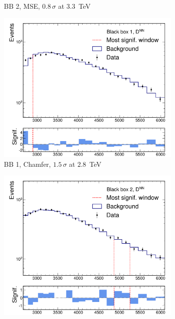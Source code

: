 \documentclass[letterpaper,11pt]{article}
\begin{document}
\begin{figure}[htpb]
\begin{subfigure}[b]{0.45\textwidth}
        \caption*{BB 2, MSE, $0.8\,\sigma$ at $3.3$~TeV}
    \end{subfigure}
    \begin{subfigure}[b]{0.45\textwidth}
        \includegraphics[width=\textwidth]{figures/gae_sparseloss/bb1_EdgeNetSparseLoss_bumphunter.pdf}
        \caption*{BB 1, Chamfer, $1.5\,\sigma$ at $2.8$~TeV}
    \end{subfigure}
    \begin{subfigure}[b]{0.45\textwidth}
        \includegraphics[width=\textwidth]{figures/gae_sparseloss/bb2_EdgeNetSparseLoss_bumphunter.pdf}

\end{subfigure}
\end{figure}
\end{document}
